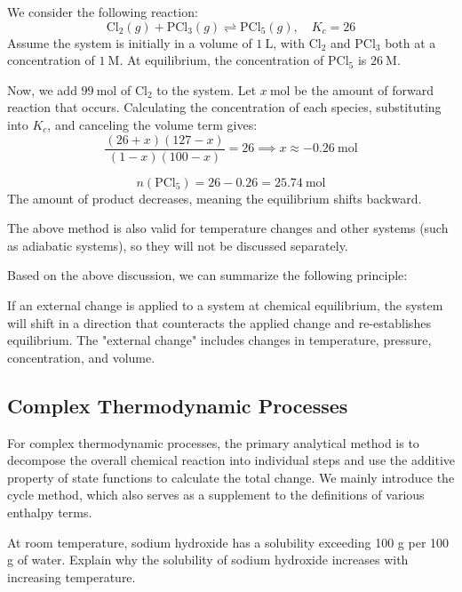 \begin{example}
We consider the following reaction:
$$\text{Cl}_2(g) + \text{PCl}_3(g) \rightleftharpoons  \text{PCl}_5(g),\quad K_c = 26$$
Assume the system is initially in a volume of $1\ \mathrm{L}$, with $\text{Cl}_2$ and $\text{PCl}_3$ both at a concentration of $1\ \mathrm{M}$. At equilibrium, the concentration of $\text{PCl}_5$ is $26\ \mathrm{M}$.

Now, we add $99\ \mathrm{mol}$ of $\text{Cl}_2$ to the system. Let $x\ \mathrm{mol}$ be the amount of forward reaction that occurs. Calculating the concentration of each species, substituting into $K_c$, and canceling the volume term gives:
$$\frac{(26+x)(127-x)}{(1-x)(100-x)} = 26 \implies x \approx -0.26\ \mathrm{mol}$$

$$n(\text{PCl}_5) = 26 - 0.26 = 25.74\ \mathrm{mol}$$
The amount of product decreases, meaning the equilibrium shifts backward.
\end{example}

The above method is also valid for temperature changes and other systems (such as adiabatic systems), so they will not be discussed separately.

Based on the above discussion, we can summarize the following principle:

\begin{proposition}
If an external change is applied to a system at chemical equilibrium, the system will shift in a direction that counteracts the applied change and re-establishes equilibrium. The "external change" includes changes in temperature, pressure, concentration, and volume.
\end{proposition}

\subsection{Complex Thermodynamic Processes}

For complex thermodynamic processes, the primary analytical method is to decompose the overall chemical reaction into individual steps and use the additive property of state functions to calculate the total change. We mainly introduce the cycle method, which also serves as a supplement to the definitions of various enthalpy terms.

\begin{example}
At room temperature, sodium hydroxide has a solubility exceeding 100 g per 100 g of water. Explain why the solubility of sodium hydroxide increases with increasing temperature.
\end{example}

